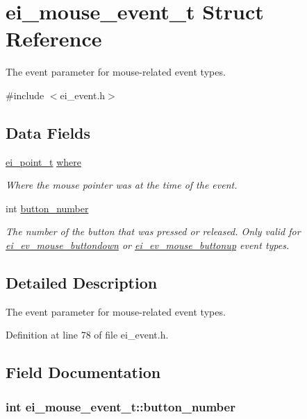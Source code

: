 \hypertarget{structei__mouse__event__t}{\section{ei\-\_\-mouse\-\_\-event\-\_\-t Struct Reference}
\label{structei__mouse__event__t}
}


The event parameter for mouse-\/related event types.  




{\ttfamily \#include $<$ei\-\_\-event.\-h$>$}

\subsection*{Data Fields}
\begin{DoxyCompactItemize}
\item 
\hyperlink{structei__point__t}{ei\-\_\-point\-\_\-t} \hyperlink{structei__mouse__event__t_ac50f216f7af2a99469bd39cebc309af5}{where}
\begin{DoxyCompactList}\small\item\em Where the mouse pointer was at the time of the event. \end{DoxyCompactList}\item 
int \hyperlink{structei__mouse__event__t_a3165d2e07c861aa9ccb114a10a6b0afb}{button\-\_\-number}
\begin{DoxyCompactList}\small\item\em The number of the button that was pressed or released. Only valid for \hyperlink{ei__event_8h_a132dde064150d861ad24e9d839cbe007ae75b2b6a8423d54c46a418d222e0af66}{ei\-\_\-ev\-\_\-mouse\-\_\-buttondown} or \hyperlink{ei__event_8h_a132dde064150d861ad24e9d839cbe007aabd9931e36fb3628cc044a2aafc2c7e4}{ei\-\_\-ev\-\_\-mouse\-\_\-buttonup} event types. \end{DoxyCompactList}\end{DoxyCompactItemize}


\subsection{Detailed Description}
The event parameter for mouse-\/related event types. 

Definition at line 78 of file ei\-\_\-event.\-h.



\subsection{Field Documentation}
\hypertarget{structei__mouse__event__t_a3165d2e07c861aa9ccb114a10a6b0afb}{
\subsubsection[{button\-\_\-number}]{\setlength{\rightskip}{0pt plus 5cm}int ei\-\_\-mouse\-\_\-event\-\_\-t\-::button\-\_\-number}}\label{structei__mouse__event__t_a3165d2e07c861aa9ccb114a10a6b0afb}


